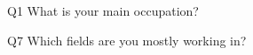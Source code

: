 \begin{description}%
\item{Q1} What is your main occupation?%
\item{Q7} Which fields are you mostly working in?%
\end{description}%
